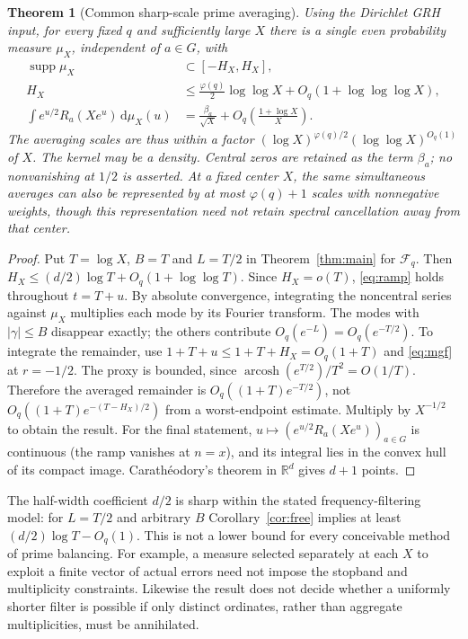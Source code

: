 \documentclass[11pt]{article}
\newtheorem{theorem}{Theorem}[section]
\theoremstyle{definition}\newtheorem{definition}[theorem]{Definition}
\newcommand{\R}{\mathbb R}\newcommand{\C}{\mathbb C}\newcommand{\F}{\mathcal F}\newcommand{\sinc}{\operatorname{sinc}}\newcommand{\arcosh}{\operatorname{arcosh}}\newcommand{\sech}{\operatorname{sech}}\newcommand{\ord}{\operatorname{ord}}\newcommand{\supp}{\operatorname{supp}}\newcommand{\dd}{\,\mathrm d}\newcommand{\vnorm}[1]{\lVert #1\rVert}
\begin{document}
\begin{theorem}[Common sharp-scale prime averaging]\label{thm:prime}
Using the Dirichlet GRH input, for every fixed $q$ and sufficiently large $X$ there is a single even probability measure $\mu_X$, independent of $a\in G$, with
\begin{align*}
 \supp\mu_X &\subset [-H_X,H_X],\\
 H_X&\le\frac{\varphi(q)}2\log\log X+O_q(1+\log\log\log X),\\
 \int e^{u/2}R_a(Xe^u)\dd\mu_X(u)&=\frac{\beta_a}{\sqrt X}+O_q\left(\frac{1+\log X}{X}\right).
\end{align*}
The averaging scales are thus within a factor $(\log X)^{\varphi(q)/2}(\log\log X)^{O_q(1)}$ of $X$. The kernel may be a density. Central zeros are retained as the term $\beta_a$; no nonvanishing at $1/2$ is asserted. At a fixed center $X$, the same simultaneous averages can also be represented by at most $\varphi(q)+1$ scales with nonnegative weights, though this representation need not retain spectral cancellation away from that center.
\end{theorem}
\begin{proof}
Put $T=\log X$, $B=T$ and $L=T/2$ in Theorem~\ref{thm:main} for $\F_q$. Then $H_X\le(d/2)\log T+O_q(1+\log\log T)$. Since $H_X=o(T)$, \eqref{eq:ramp} holds throughout $t=T+u$. By absolute convergence, integrating the noncentral series against $\mu_X$ multiplies each mode by its Fourier transform. The modes with $|\gamma|\le B$ disappear exactly; the others contribute $O_q(e^{-L})=O_q(e^{-T/2})$. To integrate the remainder, use $1+T+u\le1+T+H_X=O_q(1+T)$ and \eqref{eq:mgf} at $r=-1/2$. The proxy is bounded, since $\arcosh(e^{T/2})/T^2=O(1/T)$. Therefore the averaged remainder is $O_q((1+T)e^{-T/2})$, not $O_q((1+T)e^{-(T-H_X)/2})$ from a worst-endpoint estimate. Multiply by $X^{-1/2}$ to obtain the result. For the final statement, $u\mapsto(e^{u/2}R_a(Xe^u))_{a\in G}$ is continuous (the ramp vanishes at $n=x$), and its integral lies in the convex hull of its compact image. Carath\'eodory's theorem in $\R^d$ gives $d+1$ points.
\end{proof}

The half-width coefficient $d/2$ is sharp within the stated frequency-filtering model: for $L=T/2$ and arbitrary $B$ Corollary~\ref{cor:free} implies at least $(d/2)\log T-O_q(1)$. This is not a lower bound for every conceivable method of prime balancing. For example, a measure selected separately at each $X$ to exploit a finite vector of actual errors need not impose the stopband and multiplicity constraints. Likewise the result does not decide whether a uniformly shorter filter is possible if only distinct ordinates, rather than aggregate multiplicities, must be annihilated.
\end{document}
